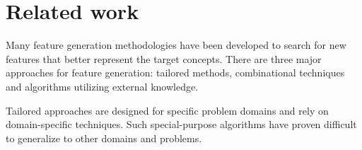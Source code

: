 \documentclass{article}
\theoremstyle{definition}
\begin{document}
		
		
		
		
		

\section{Related work}

Many feature generation methodologies have been developed to search for new features that better represent the target concepts. There are three major approaches for feature generation: tailored methods, combinational techniques and algorithms utilizing external knowledge.

Tailored approaches \citep{sutton1991learning,hirsh1994bootstrapping} are designed for specific problem domains and rely on domain-specific techniques. %
Such special-purpose algorithms %
have proven difficult to generalize to other domains and problems.
\end{document}
